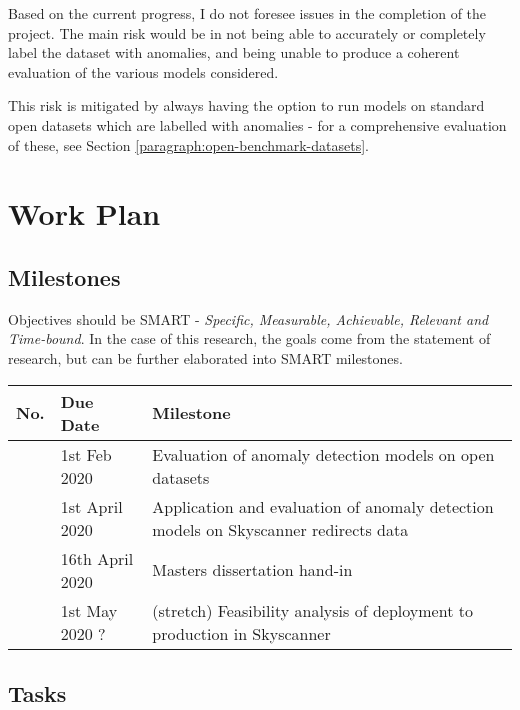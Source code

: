 \documentclass{mproj}
\newcounter{magicrownumbers}
\newcommand\rownumber{\stepcounter{magicrownumbers}\arabic{magicrownumbers}}
\begin{document}
Based on the current progress, I do not foresee issues in the completion of the project. The main risk would be in not being able to accurately or completely label the dataset with anomalies, and being unable to produce a coherent evaluation of the various models considered.

This risk is mitigated by always having the option to run models on standard  open datasets which are labelled with anomalies - for a comprehensive evaluation of these, see Section \ref{paragraph:open-benchmark-datasets}.

\section{Work Plan}

\subsection{Milestones}

Objectives should be SMART - \textit{Specific, Measurable, Achievable, Relevant and Time-bound}. In the case of this research, the goals come from the statement of research, but can be further elaborated into SMART milestones.

\begin{center}
\begin{tabular}{ |p{1.5cm}|p{2.5cm}|p{6cm}| }
	\hline
	\textbf{No.} & \textbf{Due Date} & \textbf{Milestone} \\
	\hline
	\rownumber & 1st Feb 2020 & Evaluation of anomaly detection models on open datasets\\
	\hline
	\rownumber & 1st April 2020 & Application and evaluation of anomaly detection models on Skyscanner redirects data\\
	\hline
	\rownumber & 16th April 2020 & Masters dissertation hand-in\\
	\hline
	\rownumber & 1st May 2020 ? & (stretch) Feasibility analysis of deployment to production in Skyscanner \\
	\hline
\end{tabular}
\end{center}

\subsection{Tasks}
\end{document}

